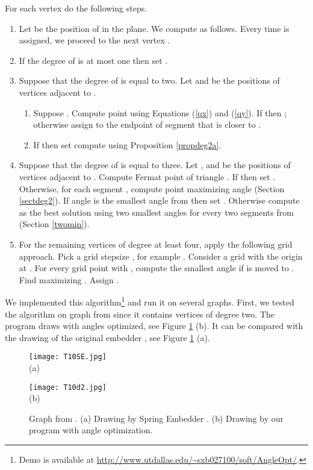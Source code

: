 \documentclass[10pt]{article}
\begin{document}
For each vertex  do the following steps.
\begin{enumerate}
\item Let  be the position of  in the plane. We compute  as follows. Every time   is assigned, we proceed to the next vertex .
\item If the degree of  is at most one then set .
\item Suppose that the degree of  is equal to two. Let  and  be the positions of vertices adjacent to . 
\begin{enumerate}
\item
Suppose . Compute point  using Equations (\ref{qx}) and (\ref{qy}).  
If  then ; otherwise assign  to the endpoint of segment  that is closer to .
\item If  then set compute  using Proposition \ref{propdeg2a}. 
\end{enumerate}
\item Suppose that the degree of  is equal to three. 
Let , and  be the positions of vertices adjacent to .
Compute Fermat point  of triangle .
If  then set . Otherwise, 
for each segment , compute point  maximizing angle 
 (Section \ref{sectdeg2}). If angle  is the smallest angle from
 then set . 
Otherwise compute  as the best solution using two smallest angles for every two segments from  (Section \ref{twomin}). 
\item 
For the remaining vertices of degree at least four, apply the following grid approach.
Pick a grid stepsize , for example . 
Consider a grid with the origin at . For every grid point  with ,
compute the smallest angle  if  is moved to . Find  maximizing 
. Assign .
\end{enumerate}


We implemented this algorithm\footnote{Demo is available at 
\url{http://www.utdallas.edu/~sxb027100/soft/AngleOpt/}.} and run it on several graphs.
First, we tested the algorithm on graph  from \cite{rv-06} since it contains vertices of degree two.  The program draws  with angles optimized, see Figure \ref{t10} (b). 
It can be compared with the drawing of the original embedder \cite{embedder}, see
Figure \ref{t10} (a). 

\begin{figure}[htp]
\centering
\begin{minipage}[b]{0.45\linewidth}
\centering \texttt{[image: T10SE.jpg]}\\ (a)
\end{minipage}
\begin{minipage}[b]{0.45\linewidth}
\centering \texttt{[image: T10d2.jpg]}\\ (b)
\end{minipage}
\caption{Graph  from \cite{rv-06}. (a) Drawing by Spring Embedder \cite{embedder}.
(b) Drawing by our program with angle optimization.}
\label{t10}
\end{figure}
\end{document}
